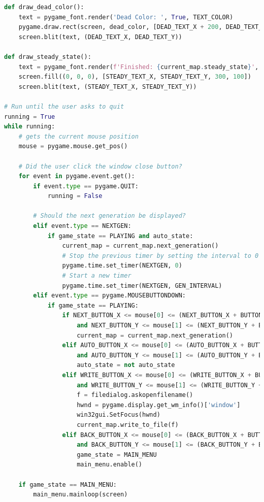 \documentclass[12pt]{report}
\begin{document}
\begin{lstlisting}[language=Python, caption=game\_of\_life.py]
def draw_dead_color():
    text = pygame_font.render('Dead Color: ', True, TEXT_COLOR)
    pygame.draw.rect(screen, dead_color, [DEAD_TEXT_X + 200, DEAD_TEXT_Y, 20, 20])
    screen.blit(text, (DEAD_TEXT_X, DEAD_TEXT_Y))

def draw_steady_state():
    text = pygame_font.render(f'Finished: {current_map.steady_state}', True, TEXT_COLOR)
    screen.fill((0, 0, 0), [STEADY_TEXT_X, STEADY_TEXT_Y, 300, 100])
    screen.blit(text, (STEADY_TEXT_X, STEADY_TEXT_Y))

# Run until the user asks to quit
running = True
while running:
    # gets the current mouse position
    mouse = pygame.mouse.get_pos()

    # Did the user click the window close button?
    for event in pygame.event.get():
        if event.type == pygame.QUIT:
            running = False

        # Should the next generation be displayed?
        elif event.type == NEXTGEN:
            if game_state == PLAYING and auto_state:
                current_map = current_map.next_generation()
                # Stop the previous timer by setting the interval to 0
                pygame.time.set_timer(NEXTGEN, 0)
                # Start a new timer
                pygame.time.set_timer(NEXTGEN, GEN_INTERVAL)
        elif event.type == pygame.MOUSEBUTTONDOWN:
            if game_state == PLAYING:
                if NEXT_BUTTON_X <= mouse[0] <= (NEXT_BUTTON_X + BUTTON_WIDTH_SMALL) \
                    and NEXT_BUTTON_Y <= mouse[1] <= (NEXT_BUTTON_Y + BUTTON_HEIGHT):
                    current_map = current_map.next_generation()
                elif AUTO_BUTTON_X <= mouse[0] <= (AUTO_BUTTON_X + BUTTON_WIDTH_LARGE) \
                    and AUTO_BUTTON_Y <= mouse[1] <= (AUTO_BUTTON_Y + BUTTON_HEIGHT):
                    auto_state = not auto_state
                elif WRITE_BUTTON_X <= mouse[0] <= (WRITE_BUTTON_X + BUTTON_WIDTH_SMALL) \
                    and WRITE_BUTTON_Y <= mouse[1] <= (WRITE_BUTTON_Y + BUTTON_HEIGHT):
                    f = filedialog.askopenfilename()
                    hwnd = pygame.display.get_wm_info()['window']
                    win32gui.SetFocus(hwnd)
                    current_map.write_to_file(f)
                elif BACK_BUTTON_X <= mouse[0] <= (BACK_BUTTON_X + BUTTON_WIDTH_SMALL) \
                    and BACK_BUTTON_Y <= mouse[1] <= (BACK_BUTTON_Y + BUTTON_HEIGHT):
                    game_state = MAIN_MENU
                    main_menu.enable()

    if game_state == MAIN_MENU:
        main_menu.mainloop(screen)


\end{lstlisting}
\end{document}
